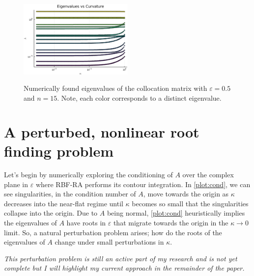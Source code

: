 \documentclass[a4paper,11pt]{article}
\newcommand{\eps}{\varepsilon}
\begin{document}
\begin{figure}[t]
	\centering
	\captionsetup{width = 0.5\textwidth}
	\caption{Numerically found eigenvalues of the collocation matrix with $ \eps = 0.5 $ and $ n = 15 $. Note, each color corresponds to a distinct eigenvalue.}
	\includegraphics[width = 0.5\textwidth]{Images/Eigen.png}
	\label{plot:eigs}
\end{figure}

\section{A perturbed, nonlinear root finding problem}
Let's begin by numerically exploring the conditioning of $ A $ over the complex plane in $ \eps $ where RBF-RA performs its contour integration. In \autoref{plot:cond}, we can see singularities, in the condition number of $ A $, move towards the origin as $ \kappa $ decreases into the near-flat regime until $ \kappa $ becomes so small that the singularities collapse into the origin. Due to $ A $ being normal, \autoref{plot:cond} heuristically implies the eigenvalues of $ A $ have roots in $ \eps $ that migrate towards the origin in the $ \kappa \to 0 $ limit. So, a natural perturbation problem arises; how do the roots of the eigenvalues of $ A $ change under small perturbations in $ \kappa $.

\emph{This perturbation problem is still an active part of my research and is not yet complete but I will highlight my current approach in the remainder of the paper. }
\end{document}
